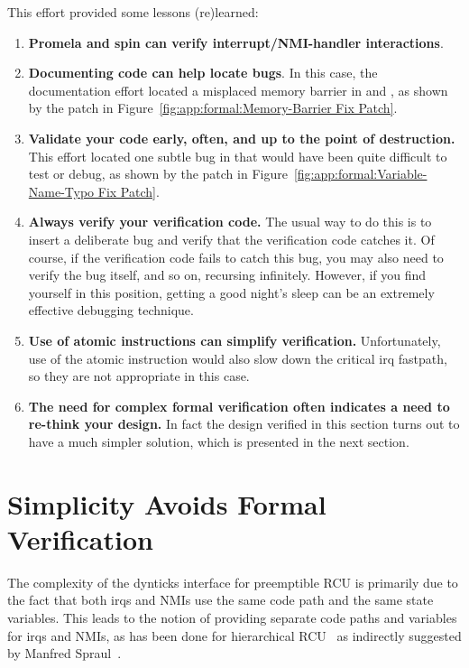 This effort provided some lessons (re)learned:

\begin{enumerate}
\item	{\bf Promela and spin can verify interrupt/NMI-handler
	interactions}.
\item	{\bf Documenting code can help locate bugs}.
	In this case, the documentation effort located
	a misplaced memory barrier in
	 and ,
	as shown by the patch in
	Figure~\ref{fig:app:formal:Memory-Barrier Fix Patch}.
\item	{\bf Validate your code early, often, and up to the point
	of destruction.}
	This effort located one subtle bug in
	that would have been quite difficult to test or debug, as
	shown by the patch in
	Figure~\ref{fig:app:formal:Variable-Name-Typo Fix Patch}.
\item	{\bf Always verify your verification code.}
	The usual way to do this is to insert a deliberate bug
	and verify that the verification code catches it.  Of course,
	if the verification code fails to catch this bug, you may also
	need to verify the bug itself, and so on, recursing infinitely.
	However, if you find yourself in this position,
	getting a good night's sleep
	can be an extremely effective debugging technique.
\item	{\bf Use of atomic instructions can simplify verification.}
	Unfortunately, use of the  atomic instruction
	would also slow down the critical irq fastpath, so they
	are not appropriate in this case.
\item	{\bf The need for complex formal verification often indicates
	a need to re-think your design.}
	In fact the design verified in this section turns out to have
	a much simpler solution, which is presented in the next section.
\end{enumerate}

\section{Simplicity Avoids Formal Verification}
\label{app:formal:Simplicity Avoids Formal Verification}

The complexity of the dynticks interface for preemptible RCU is primarily
due to the fact that both irqs and NMIs use the same code path and the
same state variables.
This leads to the notion of providing separate code paths and variables
for irqs and NMIs, as has been done for
hierarchical RCU~\cite{PaulEMcKenney2008HierarchicalRCU}
as indirectly suggested by
Manfred Spraul~\cite{ManfredSpraul2008StateMachineRCU}.

